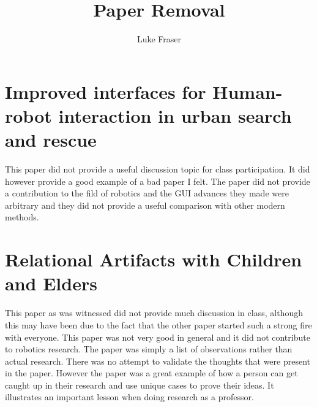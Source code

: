 \documentclass{article}
\author{Luke Fraser}
\title{Paper Removal}
\begin{document}
\maketitle
\section{Improved interfaces for Human-robot interaction in urban search and rescue}
This paper did not provide a useful discussion topic for class participation. It did however provide a good example of a bad paper I felt. The paper did not provide a contribution to the fild of robotics and  the GUI advances they made were arbitrary and they did not provide a useful comparison with other modern methods.

\section{Relational Artifacts with Children and Elders}
This paper as was witnessed did not provide much discussion in class, although this may have been due to the fact that the other paper started such a strong fire with everyone. This paper was not very good in general and it did not contribute to robotics research. The paper was simply a list of observations rather than actual research. There was no attempt to validate the thoughts that were present in the paper. However the paper was a great example of how a person can get caught up in their research and use unique cases to prove their ideas. It illustrates an important lesson when doing research as a professor.
\end{document}
